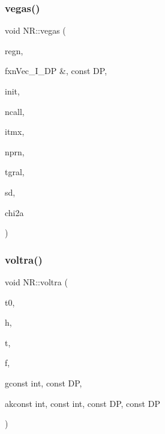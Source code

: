 \subsubsection{\texorpdfstring{vegas()}{vegas()}}
{\footnotesize\ttfamily void N\+R\+::vegas (\begin{DoxyParamCaption}\item[{\mbox{\hyperlink{namespaceNR_a9f943da53862537c552e2a770cb170ae}{Vec\+\_\+\+I\+\_\+\+DP}} \&}]{regn,  }\item[{\mbox{\hyperlink{namespaceNR_af6ff762dd605ff477b8e52387253a02a}{DP}} }]{fxnVec\+\_\+\+I\+\_\+\+D\+P \&, const DP,  }\item[{const int}]{init,  }\item[{const int}]{ncall,  }\item[{const int}]{itmx,  }\item[{const int}]{nprn,  }\item[{\mbox{\hyperlink{namespaceNR_af6ff762dd605ff477b8e52387253a02a}{DP}} \&}]{tgral,  }\item[{\mbox{\hyperlink{namespaceNR_af6ff762dd605ff477b8e52387253a02a}{DP}} \&}]{sd,  }\item[{\mbox{\hyperlink{namespaceNR_af6ff762dd605ff477b8e52387253a02a}{DP}} \&}]{chi2a }\end{DoxyParamCaption})}

\mbox{\label{namespaceNR_a7a4c7656e6a76336fb4d33e46f9c556c}} 
\subsubsection{\texorpdfstring{voltra()}{voltra()}}
{\footnotesize\ttfamily void N\+R\+::voltra (\begin{DoxyParamCaption}\item[{const \mbox{\hyperlink{namespaceNR_af6ff762dd605ff477b8e52387253a02a}{DP}}}]{t0,  }\item[{const \mbox{\hyperlink{namespaceNR_af6ff762dd605ff477b8e52387253a02a}{DP}}}]{h,  }\item[{\mbox{\hyperlink{namespaceNR_a970094d23441f8ef6a45282a7eb2103d}{Vec\+\_\+\+O\+\_\+\+DP}} \&}]{t,  }\item[{\mbox{\hyperlink{namespaceNR_adc1f8da33094b6bbeb1f5f899515ce54}{Mat\+\_\+\+O\+\_\+\+DP}} \&}]{f,  }\item[{\mbox{\hyperlink{namespaceNR_af6ff762dd605ff477b8e52387253a02a}{DP}} }]{gconst int, const DP,  }\item[{\mbox{\hyperlink{namespaceNR_af6ff762dd605ff477b8e52387253a02a}{DP}} }]{akconst int, const int, const D\+P, const DP }\end{DoxyParamCaption})}

